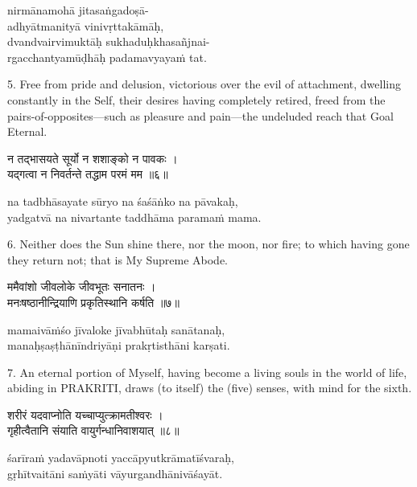 \begin{transliteration}
nirmānamohā jitasaṅgadoṣā- \\
\tab adhyātmanityā vinivṛttakāmāḥ, \\
dvandvairvimuktāḥ sukhaduḥkhasañjnai- \\
\tab rgacchantyamūḍhāḥ padamavyayaṁ tat.
\end{transliteration}

5. Free from pride and delusion, victorious over the evil of attachment,
dwelling constantly in the Self, their desires having completely retired, freed
from the pairs-of-opposites---such as pleasure and pain---the undeluded reach
that Goal Eternal.

\begin{gitaverse}
न तद्भासयते सूर्यो न शशाङ्को न पावकः । \\
यद्गत्वा न निवर्तन्ते तद्धाम परमं मम ॥६॥
\end{gitaverse}

\begin{transliteration}
na tadbhāsayate sūryo na śaśāṅko na pāvakaḥ, \\
yadgatvā na nivartante taddhāma paramaṁ mama.
\end{transliteration}

6. Neither does the Sun shine there, nor the moon, nor fire; to which having
gone they return not; that is My Supreme Abode.

\begin{gitaverse}
ममैवांशो जीवलोके जीवभूतः सनातनः । \\
मनःषष्ठानीन्द्रियाणि प्रकृतिस्थानि कर्षति ॥७॥
\end{gitaverse}

\begin{transliteration}
mamaivāṁśo jīvaloke jīvabhūtaḥ sanātanaḥ, \\
manaḥṣaṣṭhānīndriyāṇi prakṛtisthāni karṣati.
\end{transliteration}

7. An eternal portion of Myself, having become a living souls in the world of
life, abiding in PRAKRITI, draws (to itself) the (five) senses, with mind for
the sixth.

\begin{gitaverse}
शरीरं यदवाप्नोति यच्चाप्युत्क्रामतीश्वरः । \\
गृहीत्वैतानि संयाति वायुर्गन्धानिवाशयात् ॥८॥
\end{gitaverse}

\begin{transliteration}
śarīraṁ yadavāpnoti yaccāpyutkrāmatīśvaraḥ, \\
gṛhītvaitāni saṁyāti vāyurgandhānivāśayāt.
\end{transliteration}

